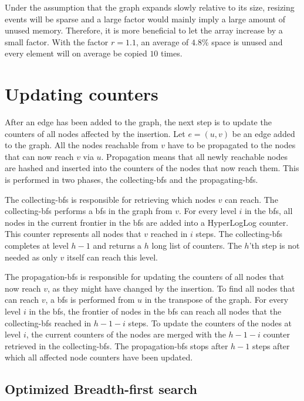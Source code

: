 Under the assumption that the graph expands slowly relative to its size, resizing events will be sparse and a large factor would mainly imply a large amount of unused memory. Therefore, it is more beneficial to let the array increase by a small factor. With the factor $r = 1.1$, an average of $4.8$\% space is unused and every element will on average be copied $10$ times.

\section{Updating counters}

After an edge has been added to the graph, the next step is to update the counters of all nodes affected by the insertion. Let $e = (u,v)$ be an edge added to the graph. All the nodes reachable from $v$ have to be propagated to the nodes that can now reach $v$ via $u$. Propagation means that all newly reachable nodes are hashed and inserted into the counters of the nodes that now reach them. This is performed in two phases, the collecting-bfs and the propagating-bfs.

The collecting-bfs is responsible for retrieving which nodes $v$ can reach. The collecting-bfs performs a bfs in the graph from $v$. For every level $i$ in the bfs, all nodes in the current frontier in the bfs are added into a HyperLogLog counter. This counter represents all nodes that $v$ reached in $i$ steps. The collecting-bfs completes at level $h-1$ and returns a $h$ long list of counters. The $h$'th step is not needed as only $v$ itself can reach this level.

The propagation-bfs is responsible for updating the counters of all nodes that now reach $v$, as they might have changed by the insertion. To find all nodes that can reach $v$, a bfs is performed from $u$ in the transpose of the graph. For every level $i$ in the bfs, the frontier of nodes in the bfs can reach all nodes that the collecting-bfs reached in $h-1-i$ steps. To update the counters of the nodes at level $i$, the current counters of the nodes are merged with the $h-1-i$ counter retrieved in the collecting-bfs. The propagation-bfs stops after $h-1$ steps after which all affected node counters have been updated.


\subsection{Optimized Breadth-first search}

